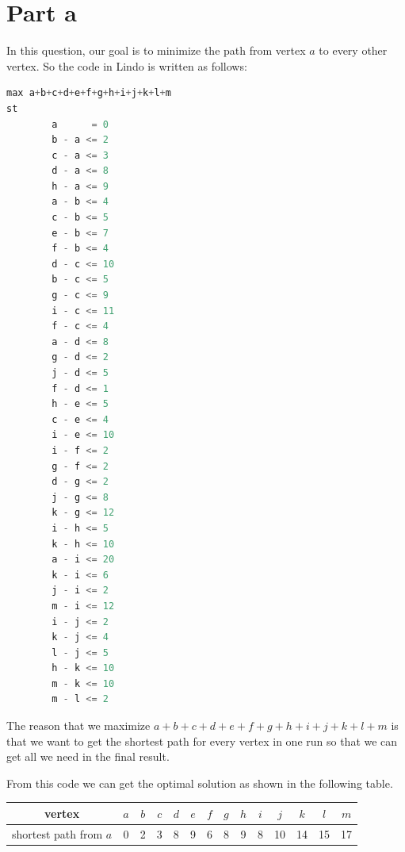 \documentclass[11pt]{scrreprt}
\begin{document}
\section{Part a}
In this question, our goal is to minimize the path from vertex $a$ to every other vertex. So the code in Lindo is written as follows:
\begin{lstlisting}[language=c]
max a+b+c+d+e+f+g+h+i+j+k+l+m
st
        a      = 0 
        b - a <= 2
        c - a <= 3
        d - a <= 8
        h - a <= 9
        a - b <= 4
        c - b <= 5
        e - b <= 7
        f - b <= 4
        d - c <= 10
        b - c <= 5
        g - c <= 9
        i - c <= 11
        f - c <= 4
        a - d <= 8
        g - d <= 2
        j - d <= 5
        f - d <= 1
        h - e <= 5
        c - e <= 4
        i - e <= 10
        i - f <= 2
        g - f <= 2
        d - g <= 2
        j - g <= 8
        k - g <= 12
        i - h <= 5
        k - h <= 10
        a - i <= 20
        k - i <= 6
        j - i <= 2
        m - i <= 12
        i - j <= 2
        k - j <= 4
        l - j <= 5
        h - k <= 10
        m - k <= 10
        m - l <= 2
\end{lstlisting}

The reason that we maximize $a+b+c+d+e+f+g+h+i+j+k+l+m$ is that we want to get the shortest path for every vertex in one run so that we can get all we need in the final result.

From this code we can get the optimal solution as shown in the following table.\\
\begin{tabular}{|c|c|c|c|c|c|c|c|c|c|c|c|c|c|}
	\hline vertex & $a$   &  $b$ & $c$ & $d$ & $e$ & $f$ & $g$ & $h$ & $i$  & $j$ & $k$ & $l$ & $m$   \\
	\hline shortest path from $a$ & 0 & 2 & 3 & 8 & 9 & 6 & 8 & 9 & 8 & 10 & 14 & 15 & 17       \\
	\hline
\end{tabular} \\
\end{document}
